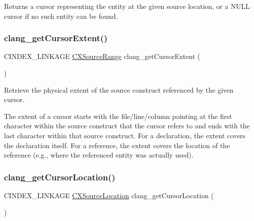 \begin{DoxyReturn}{Returns}
a cursor representing the entity at the given source location, or a N\+U\+LL cursor if no such entity can be found. 
\end{DoxyReturn}
\mbox{\label{group__CINDEX__CURSOR__SOURCE_ga79f6544534ab73c78a8494c4c0bc2840}} 
\subsubsection{\texorpdfstring{clang\+\_\+get\+Cursor\+Extent()}{clang\_getCursorExtent()}}
{\footnotesize\ttfamily C\+I\+N\+D\+E\+X\+\_\+\+L\+I\+N\+K\+A\+GE \hyperlink{structCXSourceRange}{C\+X\+Source\+Range} clang\+\_\+get\+Cursor\+Extent (\begin{DoxyParamCaption}\item[{\hyperlink{structCXCursor}{C\+X\+Cursor}}]{ }\end{DoxyParamCaption})}



Retrieve the physical extent of the source construct referenced by the given cursor. 

The extent of a cursor starts with the file/line/column pointing at the first character within the source construct that the cursor refers to and ends with the last character within that source construct. For a declaration, the extent covers the declaration itself. For a reference, the extent covers the location of the reference (e.\+g., where the referenced entity was actually used). \mbox{\label{group__CINDEX__CURSOR__SOURCE_gada3d3cbd3a3e83ff64f992617318dfb1}} 
\subsubsection{\texorpdfstring{clang\+\_\+get\+Cursor\+Location()}{clang\_getCursorLocation()}}
{\footnotesize\ttfamily C\+I\+N\+D\+E\+X\+\_\+\+L\+I\+N\+K\+A\+GE \hyperlink{structCXSourceLocation}{C\+X\+Source\+Location} clang\+\_\+get\+Cursor\+Location (\begin{DoxyParamCaption}\item[{\hyperlink{structCXCursor}{C\+X\+Cursor}}]{ }\end{DoxyParamCaption})}



